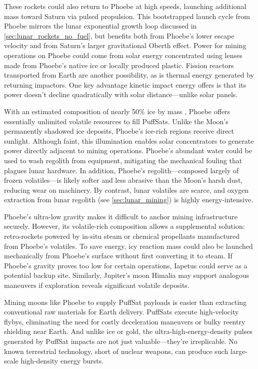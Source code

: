 \documentclass{article}
\begin{document}
These rockets could also return to Phoebe at high speeds, launching additional mass toward Saturn via pulsed propulsion. This bootstrapped launch cycle from Phoebe mirrors the lunar exponential growth loop discussed in \autoref{sec:lunar_rockets_no_fuel}, but benefits both from Phoebe’s lower escape velocity and from Saturn's larger gravitational Oberth effect. Power for mining operations on Phoebe could come from solar energy concentrated using lenses made from Phoebe's native ice or locally produced plastic. Fission reactors transported from Earth are another possibility, as is thermal energy generated by returning impactors.  One key advantage kinetic impact energy offers is that its power doesn't decline quadratically with solar distance—unlike solar panels.

With an estimated composition of nearly 50\% ice by mass \cite{phoebe}, Phoebe offers essentially unlimited volatile resources to fill PuffSats. Unlike the Moon’s permanently shadowed ice deposits, Phoebe’s ice-rich regions receive direct sunlight. Although faint, this illumination enables solar concentrators to generate power directly adjacent to mining operations. Phoebe’s abundant water could be used to wash regolith from equipment, mitigating the mechanical fouling that plagues lunar hardware. In addition, Phoebe’s regolith—composed largely of frozen volatiles—is likely softer and less abrasive than the Moon’s harsh dust, reducing wear on machinery. By contrast, lunar volatiles are scarce, and oxygen extraction from lunar regolith (see \autoref{sec:lunar_mining}) is highly energy-intensive.

Phoebe’s ultra-low gravity makes it difficult to anchor mining infrastructure securely. However, its volatile-rich composition allows a supplemental solution: retro-rockets powered by in-situ steam or chemical propellants manufactured from Phoebe's volatiles. To save energy, icy reaction mass could also be launched mechanically from Phoebe’s surface without first converting it to steam. If Phoebe’s gravity proves too low for certain operations, Iapetus could serve as a potential backup site. Similarly, Jupiter’s moon Himalia may support analogous maneuvers if exploration reveals significant volatile deposits.

Mining moons like Phoebe to supply PuffSat payloads is easier than extracting conventional raw materials for Earth delivery. PuffSats execute high-velocity flybys, eliminating the need for costly deceleration maneuvers or bulky reentry shielding near Earth. And unlike ice or gold, the ultra-high-energy-density pulses generated by PuffSat impacts are not just valuable—they’re irreplicable. No known terrestrial technology, short of nuclear weapons, can produce such large-scale high-density energy bursts.
\end{document}
